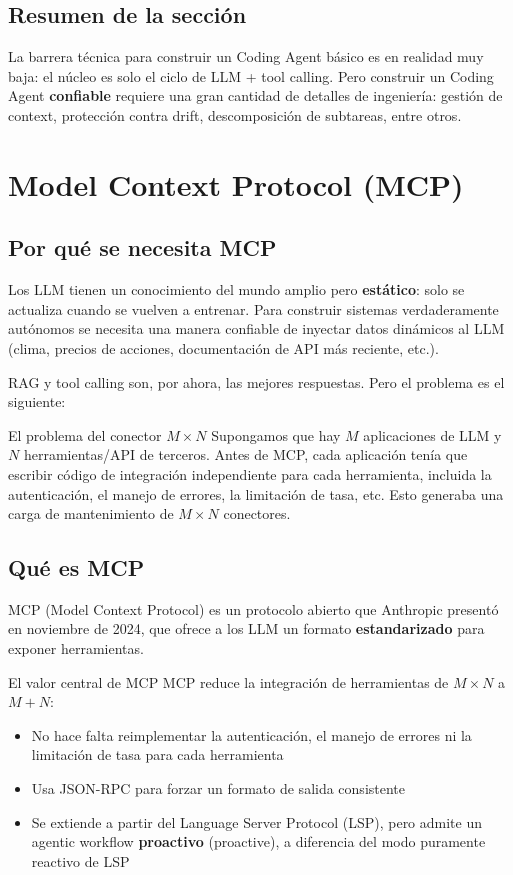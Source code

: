 \documentclass[a4paper]{article}
\begin{document}
\subsection{Resumen de la sección}

La barrera técnica para construir un Coding Agent básico es en realidad muy baja: el núcleo es solo el ciclo de LLM + tool calling. Pero construir un Coding Agent \textbf{confiable} requiere una gran cantidad de detalles de ingeniería: gestión de context, protección contra drift, descomposición de subtareas, entre otros.

\section{Model Context Protocol (MCP)}

\subsection{Por qué se necesita MCP}

Los LLM tienen un conocimiento del mundo amplio pero \textbf{estático}: solo se actualiza cuando se vuelven a entrenar. Para construir sistemas verdaderamente autónomos se necesita una manera confiable de inyectar datos dinámicos al LLM (clima, precios de acciones, documentación de API más reciente, etc.).

RAG y tool calling son, por ahora, las mejores respuestas. Pero el problema es el siguiente:

\begin{knowledgebox}{El problema del conector $M \times N$}
Supongamos que hay $M$ aplicaciones de LLM y $N$ herramientas/API de terceros. Antes de MCP, cada aplicación tenía que escribir código de integración independiente para cada herramienta, incluida la autenticación, el manejo de errores, la limitación de tasa, etc. Esto generaba una carga de mantenimiento de $M \times N$ conectores.
\end{knowledgebox}

\subsection{Qué es MCP}

MCP (Model Context Protocol) es un protocolo abierto que Anthropic presentó en noviembre de 2024, que ofrece a los LLM un formato \textbf{estandarizado} para exponer herramientas.

\begin{importantbox}{El valor central de MCP}
MCP reduce la integración de herramientas de $M \times N$ a $M + N$:
\begin{itemize}
    \item No hace falta reimplementar la autenticación, el manejo de errores ni la limitación de tasa para cada herramienta
    \item Usa JSON-RPC para forzar un formato de salida consistente
    \item Se extiende a partir del Language Server Protocol (LSP), pero admite un agentic workflow \textbf{proactivo} (proactive), a diferencia del modo puramente reactivo de LSP
\end{itemize}
\end{importantbox}
\end{document}
